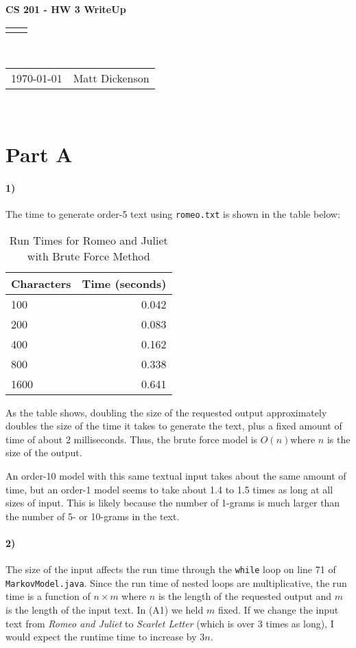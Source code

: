 \documentclass[12pt]{article}
\renewcommand{\title}[1]{\textbf{#1}\\}
\renewcommand{\line}{\begin{tabularx}{\textwidth}{X>{\raggedleft}X}\hline\\\end{tabularx}\\[-0.5cm]}
\newcommand{\leftright}[2]{\begin{tabularx}{\textwidth}{X>{\raggedleft}X}#1%
& #2\\\end{tabularx}\\[-0.5cm]}
\begin{document}
\title{CS 201 - HW 3 WriteUp}
\line
\leftright{\today}{Matt Dickenson} %
\setlength{\parindent}{16pt}

\section*{Part A}

\paragraph{1)} The time to generate order-5 text using \texttt{romeo.txt} is shown in the table below:

\begin{table}[h]
\caption{Run Times for Romeo and Juliet with Brute Force Method}
\begin{center}
\begin{tabular}{lr}
Characters & Time (seconds) \\
\hline
100 & 0.042 \\
200 & 0.083 \\
400 & 0.162 \\
800 & 0.338 \\
1600 & 0.641 \\
\end{tabular}
\end{center}
\end{table}

As the table shows, doubling the size of the requested output approximately doubles the size of the time it takes to generate the text, plus a fixed amount of time of about 2 milliseconds. Thus, the brute force model is $O(n)$where $n$ is the size of the output.  

An order-10 model with this same textual input takes about the same amount of time, but an order-1 model seems to take about 1.4 to 1.5 times as long at all sizes of input. This is likely because the number of 1-grams is much larger than the number of 5- or 10-grams in the text. 

\paragraph{2)} The size of the input affects the run time through the \texttt{while} loop on line 71 of \texttt{MarkovModel.java}. Since the run time of nested loops are multiplicative, the run time is a function of $n \times m$ where $n$ is the length of the requested output and $m$ is the length of the input text. In (A1) we held $m$ fixed. If we change the input text from \emph{Romeo and Juliet} to \emph{Scarlet Letter} (which is over 3 times as long), I would expect the runtime time to increase by $3n$. 
\end{document}
